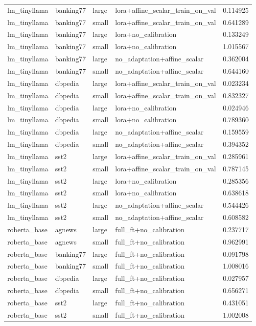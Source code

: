 \begin{tabular}{llllr}
lm_tinyllama & banking77 & large & lora+affine_scalar_train_on_val & 0.114925 \\
lm_tinyllama & banking77 & small & lora+affine_scalar_train_on_val & 0.641289 \\
lm_tinyllama & banking77 & large & lora+no_calibration & 0.133249 \\
lm_tinyllama & banking77 & small & lora+no_calibration & 1.015567 \\
lm_tinyllama & banking77 & large & no_adaptation+affine_scalar & 0.362004 \\
lm_tinyllama & banking77 & small & no_adaptation+affine_scalar & 0.644160 \\
lm_tinyllama & dbpedia & large & lora+affine_scalar_train_on_val & 0.023234 \\
lm_tinyllama & dbpedia & small & lora+affine_scalar_train_on_val & 0.832327 \\
lm_tinyllama & dbpedia & large & lora+no_calibration & 0.024946 \\
lm_tinyllama & dbpedia & small & lora+no_calibration & 0.789360 \\
lm_tinyllama & dbpedia & large & no_adaptation+affine_scalar & 0.159559 \\
lm_tinyllama & dbpedia & small & no_adaptation+affine_scalar & 0.394352 \\
lm_tinyllama & sst2 & large & lora+affine_scalar_train_on_val & 0.285961 \\
lm_tinyllama & sst2 & small & lora+affine_scalar_train_on_val & 0.787145 \\
lm_tinyllama & sst2 & large & lora+no_calibration & 0.285356 \\
lm_tinyllama & sst2 & small & lora+no_calibration & 0.638618 \\
lm_tinyllama & sst2 & large & no_adaptation+affine_scalar & 0.544426 \\
lm_tinyllama & sst2 & small & no_adaptation+affine_scalar & 0.608582 \\
roberta_base & agnews & large & full_ft+no_calibration & 0.237717 \\
roberta_base & agnews & small & full_ft+no_calibration & 0.962991 \\
roberta_base & banking77 & large & full_ft+no_calibration & 0.091798 \\
roberta_base & banking77 & small & full_ft+no_calibration & 1.008016 \\
roberta_base & dbpedia & large & full_ft+no_calibration & 0.027957 \\
roberta_base & dbpedia & small & full_ft+no_calibration & 0.656271 \\
roberta_base & sst2 & large & full_ft+no_calibration & 0.431051 \\
roberta_base & sst2 & small & full_ft+no_calibration & 1.002008 \\
\bottomrule
\end{tabular}
